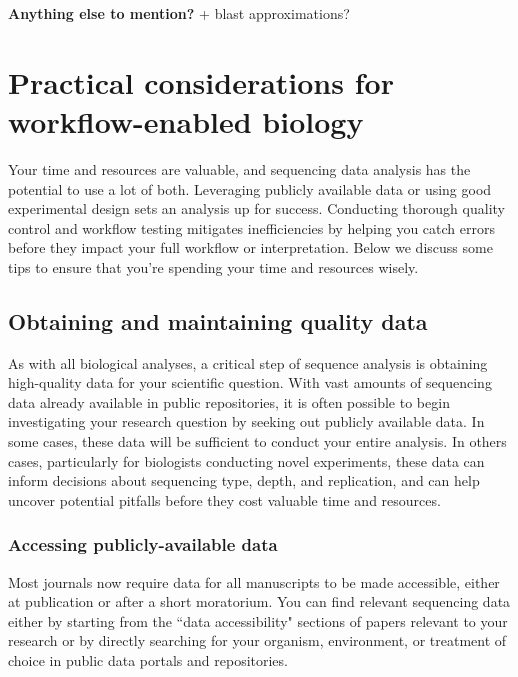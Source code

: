 \documentclass[10pt,letterpaper]{article}
\begin{document}
\textbf{Anything else to mention?}  
+ blast approximations?


\section*{Practical considerations for workflow-enabled biology}

Your time and resources are valuable, and sequencing data analysis has the potential to use a lot of both. 
Leveraging publicly available data or using good experimental design sets an analysis up for success.
Conducting thorough quality control and workflow testing mitigates inefficiencies by helping you catch errors before they impact your full workflow or interpretation. 
Below we discuss some tips to ensure that you're spending your time and resources wisely. 

\subsection*{Obtaining and maintaining quality data}

As with all biological analyses, a critical step of sequence analysis is obtaining high-quality data for your scientific question. 
With vast amounts of sequencing data already available in public repositories, it is often possible to begin investigating your research question by seeking out publicly available data. 
In some cases, these data will be sufficient to conduct your entire analysis. 
In others cases, particularly for biologists conducting novel experiments, these data can inform decisions about sequencing type, depth, and replication, and can help uncover potential pitfalls before they cost valuable time and resources.

\subsubsection*{Accessing publicly-available data}

Most journals now require data for all manuscripts to be made accessible, either at publication or after a short moratorium.
You can find relevant sequencing data either by starting from the ``data accessibility" sections of papers relevant to your research or by directly searching for your organism, environment, or treatment of choice in public data portals and repositories. 
\end{document}
